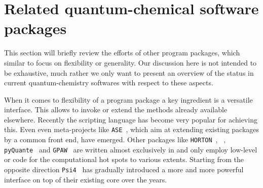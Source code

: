 \section{Related quantum-chemical software packages}
\label{sec:MolsturmRelated}
\newcommand{\psifour}{\texttt{Psi4}\xspace}
\newcommand{\pyquante}{\texttt{pyQuante}\xspace}
\newcommand{\horton}{\texttt{HORTON}\xspace}
\newcommand{\gpaw}{\texttt{GPAW}\xspace}
\newcommand{\ASE}{\texttt{ASE}\xspace}
\newcommand{\CPtK}{\texttt{CP2K}\xspace}

This section will briefly review the efforts of other program packages,
which similar to \molsturm focus on flexibility or generality.
Our discussion here is not intended to be exhaustive,
much rather we only want to present an overview of the status
in current quantum-chemistry softwares with respect to these aspects.

When it comes to flexibility of a program package
a key ingredient is a versatile interface.
This allows to invoke or extend the methods already available elsewhere.
Recently the scripting language \python has become very popular
for achieving this.
Even even meta-projects like \ASE~\cite{Larsen2017},
which aim at extending existing packages by a common \python front end,
have emerged.
Other packages like \horton~\cite{Verstraelen2017}, \pyscf~\cite{Sun2017},
\pyquante~\cite{PyQuante} and \gpaw~\cite{Mortensen2005,Enkovaara2010} are written
almost exclusively in \python and only employ low-level \ccc or \cpp
code for the computational hot spots to various extents.
Starting from the opposite direction \psifour~\cite{Parrish2017} has
gradually introduced a more and more powerful \python interface on top of
their existing \cpp core over the years.

